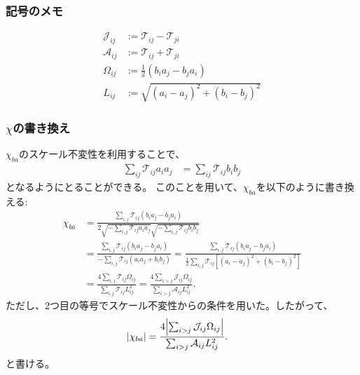 \documentclass[a4paper,11pt]{jsarticle}
\numberwithin{equation}{section}
\begin{document}
\subsubsection{記号のメモ}
\begin{align}
    \mathcal{J}_{ij} &:= \mathcal{T}_{ij} - \mathcal{T}_{ji} \\
    \mathcal{A}_{ij} &:= \mathcal{T}_{ij} + \mathcal{T}_{ji}\\
    \Omega_{ij} &:=\frac{1}{2}( b_i a_j - b_j a_i) \\
    L_{ij} &:= \sqrt{(a_i - a_j)^2 +(b_i - b_j)^2}
\end{align}

\subsubsection{$\chi$の書き換え}
$\chi_{ba}$のスケール不変性を利用することで、
\begin{align}
    \sum_{ij} \mathcal{T}_{ij} a_i a_j &= \sum_{ij} \mathcal{T}_{ij} b_i b_j
\end{align}
となるようにとることができる。
このことを用いて、$\chi_{ba}$を以下のように書き換える:
\begin{align}
\chi_{ba} &=
 \frac{\sum_{i,j}\mathcal{T}_{ij}(b_ia_j-b_ja_i)}{2\sqrt{-\sum_{i,j} \mathcal{T}_{ij}a_ia_j }\sqrt{-\sum_{i,j} \mathcal{T}_{ij}b_ib_j}}\\
&=
\frac{\sum_{i,j} \mathcal{T}_{ij} (b_i a_j - b_j a_i)}{- \sum_{i,j} \mathcal{T}_{ij} (a_i a_j + b_i b_j)}
= 
\frac{\sum_{i,j} \mathcal{T}_{ij} (b_i a_j - b_j a_i)}{\frac{1}{2} \sum_{i,j} \mathcal{T}_{ij} \left[ (a_i - a_j)^2 + (b_i - b_j)^2 \right]} \\
&=
\frac{4 \sum_{i,j} \mathcal{T}_{ij} \Omega_{ij}}{\sum_{i,j} \mathcal{T}_{ij} L_{ij}^2}
= 
\frac{4 \sum_{i>j} \mathcal{J}_{ij} \Omega_{ij}}{\sum_{i>j} \mathcal{A}_{ij} L_{ij}^2}.
\end{align}
ただし、2つ目の等号でスケール不変性からの条件を用いた。したがって、
\begin{align}
    \abs{\chi_{ba}} &=
    \frac{4 \abs{\sum_{i>j} \mathcal{J}_{ij} \Omega_{ij}}}{\sum_{i>j} \mathcal{A}_{ij} L_{ij}^2}.
\end{align}
と書ける。
\end{document}
